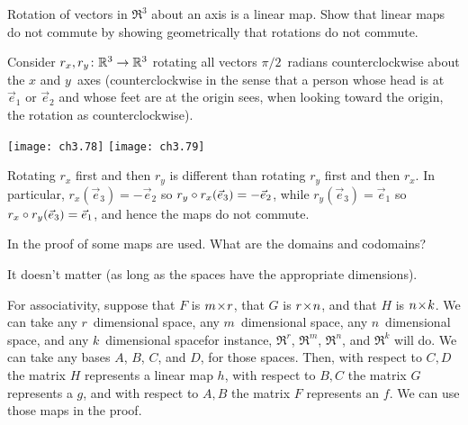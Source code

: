 \begin{exercises}
\begin{answer}
\begin{exparts}
      \end{exparts}  
    \end{answer}
  \recommended \item
    Rotation of vectors in \( \Re^3 \) about an axis is a linear map.
    Show that linear maps do not commute by     
    showing geometrically that rotations do not commute.
    \begin{answer}
      Consider \( \mbox{$r_x,r_y\colon \mathbb{R}^3\to \mathbb{R}^3$} \) rotating all vectors
      \( \pi/2 \)~radians
      counterclockwise about the \( x \) and \( y \)~axes 
      (counterclockwise in the sense that a person whose head is at
      \( \vec{e}_1 \) or \( \vec{e}_2 \) and whose feet are at the origin
      sees, when looking toward the origin, the rotation as
      counterclockwise).
      \begin{center}  \small
        \texttt{[image: ch3.78]}
        \qquad
        \texttt{[image: ch3.79]}
      \end{center}
      Rotating $r_x$ first and then $r_y$ is different than
      rotating $r_y$ first and then $r_x$.
      In particular, $r_x(\vec{e}_3)=-\vec{e}_2$
      so $r_y\mathbin\circ r_x(\vec{e}_3)=-\vec{e}_2$,
      while $r_y(\vec{e}_3)=\vec{e}_1$ so
      $r_x\mathbin\circ r_y(\vec{e}_3)=\vec{e}_1$,
      and hence the maps do not commute.
    \end{answer}
  \item \label{exer:MatProdPropsSpAndBas}
    In the proof of  some maps are used.
    What are the domains and codomains?
    \begin{answer}
      It doesn't matter (as long as the spaces have the appropriate 
     dimensions).

      For associativity, 
      suppose that $F$ is $m \! \times \! r$, that $G$ is $r \! \times \! n$, and
      that $H$ is $n \! \times \! k$.
      We can take any $r$~dimensional space, 
      any $m$~dimensional space, any $n$~dimensional space, and any
      $k$~dimensional space\Dash for instance, 
      $\Re^r$, $\Re^m$, $\Re^n$, and $\Re^k$ will do.
      We can take any bases $A$, $B$, $C$, and $D$, for those spaces.
      Then, 
      with respect to $C,D$ the matrix $H$ represents a linear map $h$,
      with respect to $B,C$ the matrix $G$ represents a $g$,
      and with respect to $A,B$ the matrix $F$ represents an $f$.
      We can use those maps in the proof.
      

\end{answer}
\end{exercises}
